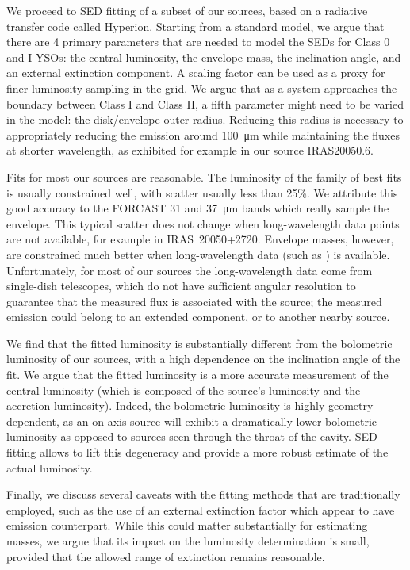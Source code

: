 We proceed to SED fitting of a subset of our sources, based on a radiative transfer code called Hyperion. Starting from a standard model, we argue that there are 4 primary parameters that are needed to model the SEDs for Class 0 and I YSOs: the central luminosity, the envelope mass, the inclination angle, and an external extinction component. A scaling factor can be used as a proxy for finer luminosity sampling in the grid. We argue that as a system approaches the boundary between Class I and Class II, a fifth parameter might need to be varied in the model: the disk/envelope outer radius. Reducing this radius is necessary to appropriately reducing the emission around \SI{100}{\um} while maintaining the fluxes at shorter wavelength, as exhibited for example in our source IRAS20050.6. 

Fits for most our sources are reasonable. The luminosity of the family of best fits is usually constrained well, with scatter usually less than 25\%. We attribute this good accuracy to the FORCAST 31 and \SI{37}{\um} bands which really sample the envelope. This typical scatter does not change when long-wavelength data points are not available, for example in IRAS~20050+2720. Envelope masses, however, are constrained much better when long-wavelength data (such as \Herschel) is available. Unfortunately, for most of our sources the long-wavelength data come from single-dish telescopes, which do not have sufficient angular resolution to guarantee that the measured flux is associated with the source; the measured emission could belong to an extended component, or to another nearby source. 

We find that the fitted luminosity is substantially different from the bolometric luminosity of our sources, with a high dependence on the inclination angle of the fit. We argue that the fitted luminosity is a more accurate measurement of the central luminosity (which is composed of the source's luminosity and the accretion luminosity). Indeed, the bolometric luminosity is highly geometry-dependent, as an on-axis source will exhibit a dramatically lower bolometric luminosity as opposed to sources seen through the throat of the cavity. SED fitting allows to lift this degeneracy and provide a more robust estimate of the actual luminosity.

Finally, we discuss several caveats with the fitting methods that are traditionally employed, such as the use of an external extinction factor which appear to have emission counterpart. While this could matter substantially for estimating masses, we argue that its impact on the luminosity determination is small, provided that the allowed range of extinction remains reasonable. 


